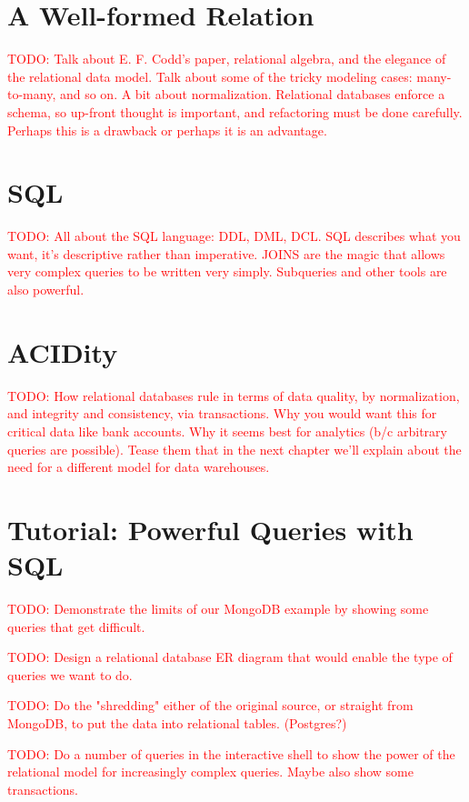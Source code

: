 \documentclass[11pt]{book}
\newcommand{\todo}[1]{\textcolor{red}{TODO: #1}} %
\begin{document}
\section{A Well-formed Relation}
\todo{Talk about E. F. Codd's paper, relational algebra, and the elegance of the relational data model.  Talk about some of the tricky modeling cases: many-to-many, and so on.  A bit about normalization.  Relational databases enforce a schema, so up-front thought is important, and refactoring must be done carefully.  Perhaps this is a drawback or perhaps it is an advantage.}

\section{SQL}
\todo{All about the SQL language: DDL, DML, DCL.  SQL describes what you want, it's descriptive rather than imperative.  JOINS are the magic that allows very complex queries to be written very simply.  Subqueries and other tools are also powerful.}

\section{ACIDity}
\todo{How relational databases rule in terms of data quality, by normalization, and integrity and consistency, via transactions.  Why you would want this for critical data like bank accounts.  Why it seems best for analytics (b/c arbitrary queries are possible).  Tease them that in the next chapter we'll explain about the need for a different model for data warehouses.}

\section*{Tutorial: Powerful Queries with SQL}

\todo{Demonstrate the limits of our MongoDB example by showing some queries that get difficult.}

\todo{Design a relational database ER diagram that would enable the type of queries we want to do.}

\todo{Do the "shredding" either of the original source, or straight from MongoDB, to put the data into relational tables. (Postgres?)}

\todo{Do a number of queries in the interactive shell to show the power of the relational model for increasingly complex queries.  Maybe also show some transactions.}
\end{document}
